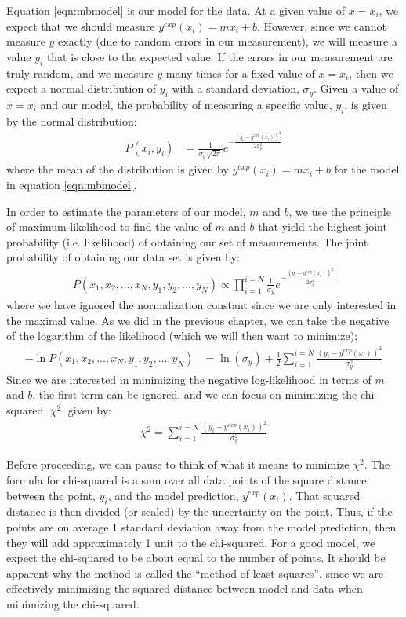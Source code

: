 Equation \ref{eqn:mbmodel} is our model for the data. At a given value of $x=x_i$, we expect that we should measure $y^{exp}(x_i)=mx_i+b$. However, since we cannot measure $y$ exactly (due to random errors in our measurement), we will measure a value $y_i$ that is close to the expected value. If the errors in our measurement are truly random, and we measure $y$ many times for a fixed value of $x=x_i$, then we expect a normal distribution of $y_i$ with a standard deviation, $\sigma_{y}$. Given a value of $x=x_i$ and our model, the probability of measuring a specific value, $y_i$, is given by the normal distribution:
\begin{align}
P(x_i,y_i)&=\frac{1}{\sigma_{y}\sqrt{2\pi}}e^{-\frac{(y_i-y^{exp}(x_i))^2}{2\sigma_{y}^2}}
\end{align}
where the mean of the distribution is given by $y^{exp}(x_i)=mx_i+b$ for the model in equation \ref{eqn:mbmodel}.

In order to estimate the parameters of our model, $m$ and $b$, we use the principle of maximum likelihood to find the value of $m$ and $b$ that yield the highest joint probability (i.e. likelihood) of obtaining our set of measurements. The joint probability of obtaining our data set is given by:
\begin{align*}
P(x_1,x_2,\dots,x_N,y_1,y_2,\dots,y_N)\propto\prod_{i=1}^{i=N}\frac{1}{\sigma_{y}}e^{-\frac{(y_i-y^{exp}(x_i))^2}{2\sigma_{y}^2}}
\end{align*}
where we have ignored the normalization constant since we are only interested in the maximal value. As we did in the previous chapter, we can take the negative of the logarithm of the likelihood (which we will then want to minimize):
\begin{align}
-\ln{P(x_1,x_2,\dots,x_N,y_1,y_2,\dots,y_N)}&=\ln(\sigma_y)+\frac{1}{2}\sum_{i=1}^{i=N}\frac{(y_i-y^{exp}(x_i))^2}{\sigma_{y}^2}
\end{align}
Since we are interested in minimizing the negative log-likelihood in terms of $m$ and $b$, the first term can be ignored, and we can focus on minimizing the chi-squared, $\chi^2$, given by:
\begin{align}
\chi^2=\sum_{i=1}^{i=N}\frac{(y_i-y^{exp}(x_i))^2}{\sigma_{y}^2}
\end{align}

Before proceeding, we can pause to think of what it means to minimize $\chi^2$. The formula for chi-squared is a sum over all data points of the square distance between the point, $y_i$, and the model prediction, $y^{exp}(x_i)$. That squared distance is then divided (or scaled) by the uncertainty on the point. Thus, if the points are on average 1 standard deviation away from the model prediction, then they will add approximately 1 unit to the chi-squared. For a good model, we expect the chi-squared to be about equal to the number of points. It should be apparent why the method is called the ``method of least squares'', since we are effectively minimizing the squared distance between model and data when minimizing the chi-squared.



